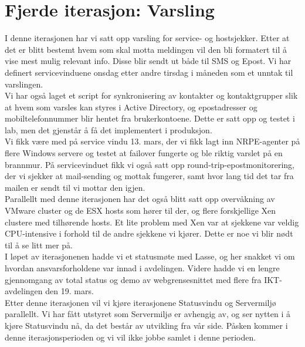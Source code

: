 
\date{Fredag 15. Mars 2013}



\maketitle
\section*{Fjerde iterasjon: Varsling}

\noindent I denne iterasjonen har vi satt opp varsling for service- og hostsjekker. Etter at det er blitt bestemt hvem som skal motta meldingen vil den bli formatert til å vise mest mulig relevant info. Disse blir sendt ut både til SMS og Epost. Vi har definert servicevinduene onsdag etter andre tirsdag i måneden som et unntak til varslingen.\\

\noindent Vi har også laget et script for synkronisering av kontakter og kontaktgrupper slik at hvem som varsles kan styres i Active Directory, og epostadresser og mobiltelefonnummer blir hentet fra brukerkontoene. Dette er satt opp og testet i lab, men det gjenstår å få det implementert i produksjon.\\

\noindent Vi fikk være med på service vindu 13. mars, der vi fikk lagt inn NRPE-agenter på flere Windows servere og testet at failover fungerte og ble riktig varslet på en brannmur. På servicevinduet fikk vi også satt opp round-trip-epostmonitorering, der vi sjekker at mail-sending og mottak fungerer, samt hvor lang tid det tar fra mailen er sendt til vi mottar den igjen.\\

\noindent Parallellt med denne iterasjonen har det også blitt satt opp overvåkning av VMware cluster og de ESX hosts som hører til der, og flere forskjellige Xen clustere med tilhørende hosts. Et lite problem med Xen var at sjekkene var veldig CPU-intensive i forhold til de andre sjekkene vi kjører. Dette er noe vi blir nødt til å se litt mer på. \\

\noindent I løpet av iterasjonenen hadde vi et statusmøte med Lasse, og her snakket vi om hvordan ansvarsforholdene var innad i avdelingen. Videre hadde vi en lengre gjennomgang av total status og demo av webgrensesnittet med flere fra IKT-avdelingen den 19. mars.\\

\noindent Etter denne iterasjonen vil vi kjøre iterasjonene Statusvindu og Servermiljø parallellt. Vi har fått utstyret som Servermiljø er avhengig av, og ser nytten i å kjøre Statusvindu nå, da det består av utvikling fra vår side. Påsken kommer i denne iterasjonsperioden og vi vil ikke jobbe samlet i denne perioden.

